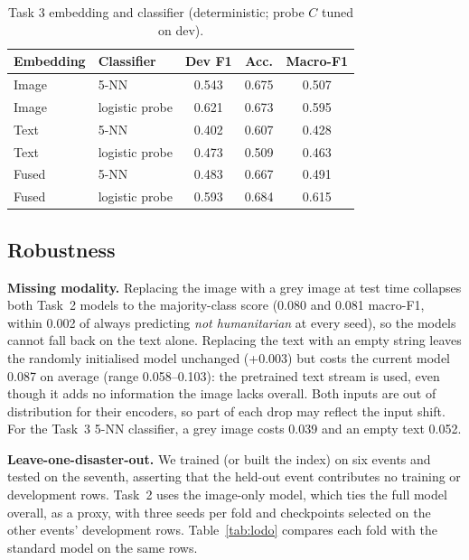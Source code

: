 \documentclass[conference]{IEEEtran}
\begin{document}
\begin{table}[t]
\centering
\caption{Task 3 embedding and classifier (deterministic; probe $C$ tuned on dev).}
\label{tab:emb3}
\footnotesize
\begin{tabular}{llccc}
\toprule
Embedding & Classifier & Dev F1 & Acc. & Macro-F1 \\
\midrule
Image & 5-NN & 0.543 & 0.675 & 0.507 \\
Image & logistic probe & 0.621 & 0.673 & 0.595 \\
Text & 5-NN & 0.402 & 0.607 & 0.428 \\
Text & logistic probe & 0.473 & 0.509 & 0.463 \\
Fused & 5-NN & 0.483 & 0.667 & 0.491 \\
Fused & logistic probe & 0.593 & 0.684 & 0.615 \\
\bottomrule
\end{tabular}
\end{table}

\subsection{Robustness}
\label{sec:robust}

\textbf{Missing modality.} Replacing the image with a grey image at test time collapses both Task~2 models to the majority-class score (0.080 and 0.081 macro-F1, within 0.002 of always predicting \emph{not humanitarian} at every seed), so the models cannot fall back on the text alone. Replacing the text with an empty string leaves the randomly initialised model unchanged (+0.003) but costs the current model 0.087 on average (range 0.058--0.103): the pretrained text stream is used, even though it adds no information the image lacks overall. Both inputs are out of distribution for their encoders, so part of each drop may reflect the input shift. For the Task~3 5-NN classifier, a grey image costs 0.039 and an empty text 0.052.

\textbf{Leave-one-disaster-out.} We trained (or built the index) on six events and tested on the seventh, asserting that the held-out event contributes no training or development rows. Task~2 uses the image-only model, which ties the full model overall, as a proxy, with three seeds per fold and checkpoints selected on the other events' development rows. Table~\ref{tab:lodo} compares each fold with the standard model on the same rows.
\end{document}
